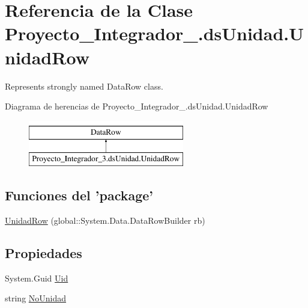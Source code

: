 \hypertarget{class_proyecto___integrador__3_1_1ds_unidad_1_1_unidad_row}{\section{Referencia de la Clase Proyecto\-\_\-\-Integrador\-\_.\-ds\-Unidad.\-Unidad\-Row}
\label{class_proyecto___integrador__3_1_1ds_unidad_1_1_unidad_row}
}


Represents strongly named Data\-Row class.  


Diagrama de herencias de Proyecto\-\_\-\-Integrador\-\_.\-ds\-Unidad.\-Unidad\-Row\begin{figure}[H]
\begin{center}
\leavevmode
\includegraphics[height=2.000000cm]{dc/d17/class_proyecto___integrador__3_1_1ds_unidad_1_1_unidad_row}
\end{center}
\end{figure}
\subsection*{Funciones del 'package'}
\begin{DoxyCompactItemize}
\item 
\hyperlink{class_proyecto___integrador__3_1_1ds_unidad_1_1_unidad_row_a62eca4ec465132b573d8e8d1f4d2550a}{Unidad\-Row} (global\-::\-System.\-Data.\-Data\-Row\-Builder rb)
\end{DoxyCompactItemize}
\subsection*{Propiedades}
\begin{DoxyCompactItemize}
\item 
System.\-Guid \hyperlink{class_proyecto___integrador__3_1_1ds_unidad_1_1_unidad_row_ab7854a6f12858fc9c8de66c59b342863}{Uid}
\item 
string \hyperlink{class_proyecto___integrador__3_1_1ds_unidad_1_1_unidad_row_a0b25b1745987d784d4554fb0f34c1f58}{No\-Unidad}
\end{DoxyCompactItemize}
